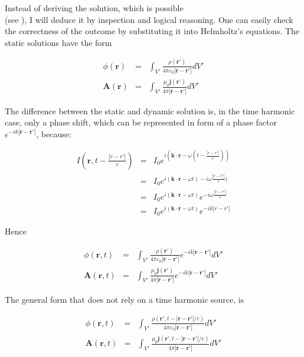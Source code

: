 \documentclass[a4paper,14pt]{extbook}
\begin{document}
Instead of deriving the solution, which is possible \\ (see \cite{emwaves}), I will deduce it by inspection and logical reasoning. One can easily check the correctness of the outcome by substituting it into Helmholtz's equations. The static solutions have the form

\begin{eqnarray}
\phi (\mathbf{r}) &=& \int_{V'} \frac{\rho ( \mathbf{r}' )}{4 \pi \varepsilon_0 |\mathbf{r} - \mathbf{r}'| } dV' \label{staticsolution1}\\
 \mathbf{A}(\mathbf{r}) &=& \int_{V'} \frac{\mu_0 \mathbf{j} ( \mathbf{r}' )}{4 \pi  |\mathbf{r} - \mathbf{r}'| \label{staticsolution2}} dV'
 \end{eqnarray}

The difference between the static and dynamic solution is, in the time harmonic case, only a phase shift, which can be represented in form of a phase factor $e^{-ik|\mathbf{r} - \mathbf{r}'|}$, because:


\begin{eqnarray}
    I \left( \mathbf{r},t-\frac{|r-r'|}{c} \right) &=&I_0e^{i(\mathbf{k}\cdot \mathbf{r}-\omega (t-\frac{|r-r'|}{c}))}\\
 &=&I_0e^{i(\mathbf{k}\cdot \mathbf{r}-\omega t)-i \omega \frac{|r-r'|}{c})}\\
 &=&I_0e^{i(\mathbf{k}\cdot \mathbf{r}-\omega t)}e^{-i \omega \frac{|r-r'|}{c}}\\
&=&I_0e^{i(\mathbf{k}\cdot \mathbf{r}-\omega t)}e^{-i k |r-r'|}
\end{eqnarray}


Hence

\begin{eqnarray}
\phi (\mathbf{r},t) &=& \int_{V'} \frac{\rho ( \mathbf{r}' )}{4 \pi \varepsilon_0 |\mathbf{r} - \mathbf{r}'| } e^{-ik|\mathbf{r} - \mathbf{r}'| } dV' \label{dynamicharmonicsolution1}\\
 \mathbf{A}(\mathbf{r},t) &=& \int_{V'} \frac{\mu_0 \mathbf{j} ( \mathbf{r}' )}{4 \pi  |\mathbf{r} - \mathbf{r}'| \label{dynamicharmonicsolution2}} e^{-ik|\mathbf{r} - \mathbf{r}'| } dV'
 \end{eqnarray}

The general form that does not rely on a time harmonic source, is

\begin{eqnarray}
\phi (\mathbf{r},t) &=& \int_{V'} \frac{\rho ( \mathbf{r}', t-|\mathbf{r} - \mathbf{r}'| /c  )}{4 \pi \varepsilon_0 |\mathbf{r} - \mathbf{r}'| } dV' \label{dynamicsolution1}\\
 \mathbf{A}(\mathbf{r},t) &=& \int_{V'} \frac{\mu_0 \mathbf{j} ( \mathbf{r}', t-|\mathbf{r} - \mathbf{r}'| /c  )}{4 \pi  |\mathbf{r} - \mathbf{r}'| \label{dynamicsolution2}}  dV'
 \end{eqnarray}
\end{document}
